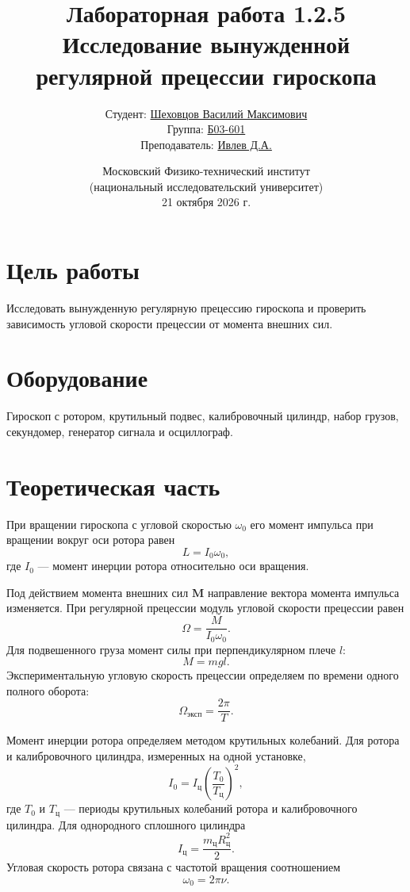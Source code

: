 \documentclass[12pt,a4paper]{article}
\title{\textbf{Лабораторная работа 1.2.5}\\
Исследование вынужденной регулярной прецессии гироскопа}
\author{
Студент: \underline{Шеховцов Василий Максимович}\\
Группа: \underline{Б03-601}\\
Преподаватель: \underline{Ивлев Д.А.}
}
\date{Московский Физико-технический институт\\
(национальный исследовательский университет)\\
21 октября 2026 г.}
\begin{document}
\maketitle

\section*{Цель работы}
Исследовать вынужденную регулярную прецессию гироскопа и проверить зависимость угловой скорости прецессии от момента внешних сил.

\section*{Оборудование}
Гироскоп с ротором, крутильный подвес, калибровочный цилиндр, набор грузов, секундомер, генератор сигнала и осциллограф.

\section*{Теоретическая часть}

При вращении гироскопа с угловой скоростью $\omega_0$ его момент импульса при вращении вокруг оси ротора равен
\[
L=I_0\omega_0,
\]
где $I_0$ --- момент инерции ротора относительно оси вращения.

Под действием момента внешних сил $\mathbf M$ направление вектора момента импульса изменяется. При регулярной прецессии модуль угловой скорости прецессии равен
\begin{equation}
\Omega=\frac{M}{I_0\omega_0}.
\label{eq:precession}
\end{equation}
Для подвешенного груза момент силы при перпендикулярном плече $l$:
\begin{equation}
M=mgl.
\label{eq:moment}
\end{equation}
Экспериментальную угловую скорость прецессии определяем по времени одного полного оборота:
\begin{equation}
\Omega_{\text{эксп}}=\frac{2\pi}{T}.
\label{eq:omegaexp}
\end{equation}

Момент инерции ротора определяем методом крутильных колебаний. Для ротора и калибровочного цилиндра, измеренных на одной установке,
\begin{equation}
I_0=I_{\text{ц}}\left(\frac{T_0}{T_{\text{ц}}}\right)^2,
\label{eq:inertia}
\end{equation}
где $T_0$ и $T_{\text{ц}}$ --- периоды крутильных колебаний ротора и калибровочного цилиндра. Для однородного сплошного цилиндра
\[
I_{\text{ц}}=\frac{m_{\text{ц}}R_{\text{ц}}^2}{2}.
\]
Угловая скорость ротора связана с частотой вращения соотношением
\begin{equation}
\omega_0=2\pi \nu.
\label{eq:spin}
\end{equation}
\end{document}
